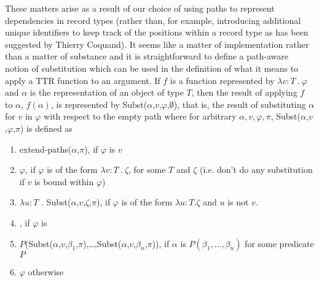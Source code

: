 These matters arise as a result of our choice of using paths to
represent dependencies in record types (rather than, for example,
introducing additional unique identifiers to keep track of the
positions within a record type as has been suggested by Thierry Coquand).  It seems like a matter of implementation rather than a matter
of substance and it is straightforward to define a path-aware notion
of substitution which can be used in the definition of what it means
to apply a TTR function to an argument.  If $f$ is a function
represented by $\lambda v:T\ .\ \varphi$ and $\alpha$ is the representation
of an object of type $T$, then the result of applying $f$ to $\alpha$,
$f(\alpha)$, is represented by Subst($\alpha$,$v$,$\varphi$,$\emptyset$),
that is, the result of substituting $\alpha$ for $v$ in $\varphi$ with
respect to the empty path where for arbitrary
$\alpha,v,\varphi,\pi$,
Subst($\alpha$,$v$,$\varphi$,$\pi$) is defined as 
\begin{enumerate} 
 
\item extend-paths($\alpha$,$\pi$), if $\varphi$ is $v$ 
 
\item $\varphi$, if $\varphi$ is of the form $\lambda v:T\ .\ \zeta$, for some
  $T$ and $\zeta$ (i.e. don't do any substitution if $v$ is bound
  within $\varphi$)

\item $\lambda u:T$ . Subst($\alpha$,$v$,$\zeta$,$\pi$), if $\varphi$ is
  of the form $\lambda u:T . \zeta$ and $u$ is not $v$.

\item
  ,
        if $\varphi$ is 

\item $P$(Subst($\alpha$,$v$,$\beta_1$,$\pi$),\ldots,Subst($\alpha$,$v$,$\beta_n$,$\pi$)),
  if $\alpha$ is $P(\beta_1,\ldots,\beta_n)$ for some predicate $P$


\item $\varphi$ otherwise
 
\end{enumerate} 
 
